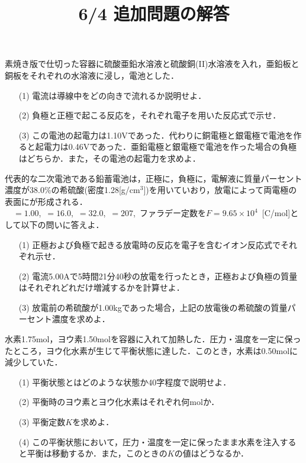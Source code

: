 \documentclass[a4paper,11pt]{ltjarticle}
\title{}
\author{}
\date{}
\title{6/4 追加問題の解答}
\author{}
\date{}
\begin{document}
\begin{que}
素焼き版で仕切った容器に硫酸亜鉛水溶液と硫酸銅(II)水溶液を入れ，亜鉛板と銅板をそれぞれの水溶液に浸し，電池とした．
\begin{itemize}
\item[(1)]電流は導線中をどの向きで流れるか説明せよ．
\item[(2)]負極と正極で起こる反応を，それぞれ電子を用いた反応式で示せ．
\item[(3)] この電池の起電力は1.10Vであった．代わりに銅電極と銀電極で電池を作ると起電力は0.46Vであった．亜鉛電極と銀電極で電池を作った場合の負極はどちらか．また，その電池の起電力を求めよ． 
\end{itemize}
\end{que}
\ans
\newpage
\begin{que}
代表的な二次電池である鉛蓄電池は，正極に，負極に，電解液に質量パーセント濃度が38.0$\%$の希硫酸(密度1.28[g/cm$^3$])を用いていおり，放電によって両電極の表面にが形成される．\\
　$=1.00$,~$=16.0$,~$=32.0$,~$=207$,~ファラデー定数を$F=9.65\times 10^{4}$~[C/mol]として以下の問いに答えよ．
\begin{itemize}
\item[(1)]正極および負極で起きる放電時の反応を電子を含むイオン反応式でそれぞれ示せ．
\item[(2)]電流5.00Aで5時間21分40秒の放電を行ったとき，正極および負極の質量はそれぞれどれだけ増減するかを計算せよ．
\item[(3)] 放電前の希硫酸が1.00kgであった場合，上記の放電後の希硫酸の質量パーセント濃度を求めよ．
\end{itemize}
\end{que}
\ans
\newpage
\begin{que}
水素1.75mol，ヨウ素1.50molを容器に入れて加熱した．圧力・温度を一定に保ったところ，ヨウ化水素が生じて平衡状態に達した．このとき，水素は0.50molに減少していた．
\begin{itemize}
\item[(1)]平衡状態とはどのような状態か40字程度で説明せよ．
\item[(2)]平衡時のヨウ素とヨウ化水素はそれぞれ何molか．
\item[(3)]平衡定数$K$を求めよ．
\item[(4)]この平衡状態において，圧力・温度を一定に保ったまま水素を注入すると平衡は移動するか．また，このときの$K$の値はどうなるか．
\end{itemize}
\end{que}
\end{document}
